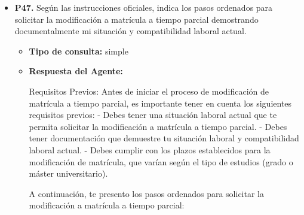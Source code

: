 \documentclass{article}
\begin{document}
\begin{itemize}
\begin{itemize}
                        Recuerde que es importante seguir las instrucciones de la \textbf{Guía completa de liquidación de viajes} y adjuntar toda la documentación necesaria para evitar retrasos en el trámite.
                  \item \textbf{Contexto utilizado:}

            \end{itemize}

      \item \textbf{P47.} Según las instrucciones oficiales, indica los pasos ordenados para solicitar la modificación a matrícula a tiempo parcial demostrando documentalmente mi situación y compatibilidad laboral actual. \\
            \begin{itemize}
                  \item \textbf{Tipo de consulta:} simple
                  \item \textbf{Respuesta del Agente:}

                        Requisitos Previos:
                        Antes de iniciar el proceso de modificación de matrícula a tiempo parcial, es importante tener en cuenta los siguientes requisitos previos:
                        - Debes tener una situación laboral actual que te permita solicitar la modificación a matrícula a tiempo parcial.
                        - Debes tener documentación que demuestre tu situación laboral y compatibilidad laboral actual.
                        - Debes cumplir con los plazos establecidos para la modificación de matrícula, que varían según el tipo de estudios (grado o máster universitario).

                        A continuación, te presento los pasos ordenados para solicitar la modificación a matrícula a tiempo parcial:


\end{itemize}
\end{itemize}
\end{document}
